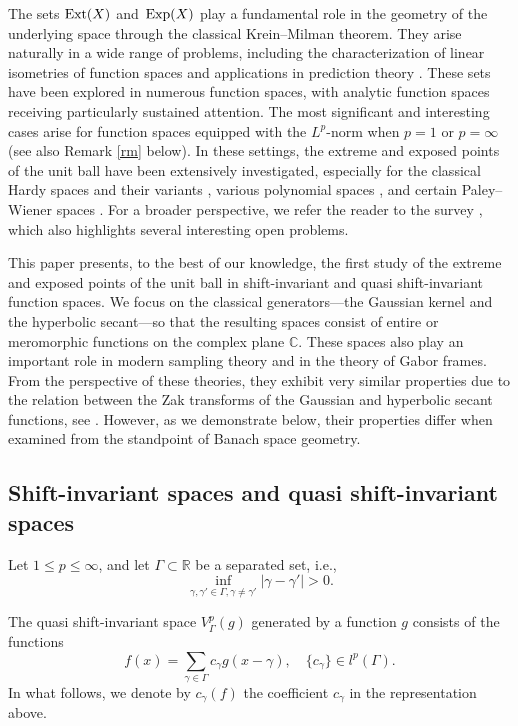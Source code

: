 \documentclass[12pt]{amsart}
\numberwithin{equation}{section}
\theoremstyle{plain}
\theoremstyle{definition}
\newcommand{\R}{{\mathbb R}} \newcommand{\Q}{{\mathbb Q}} \newcommand{\Z}{{\mathbb Z}} \newcommand{\N}{{\mathbb N}}
\newcommand{\ext}{{\rm Ext}}
\newcommand{\expo}{\,{\rm Exp}}
\begin{document}
The sets $\ext(X)$ and $\expo(X)$ play a fundamental role in the geometry of the underlying space through the classical Krein–Milman theorem. They arise naturally in a wide range of problems, including the characterization of linear isometries of function spaces  \cite{MR121646} and applications in prediction theory \cite{MR705750}.
These sets have been explored in numerous function spaces, with analytic function spaces receiving particularly sustained attention. The most significant and interesting cases arise for function spaces equipped with the 
$L^p$-norm when $p=1$ or $p=\infty$ (see also Remark \ref{rm} below). In these settings, the extreme and exposed points of the unit ball have been extensively investigated, especially for the classical Hardy spaces and their variants \cite{MR283557, MR98981, MR4394687, MR348467}, various polynomial spaces \cite{MR1783617, MR2024728, MR4205713, MR2403441},  and certain Paley–Wiener spaces \cite{MR1783617, MR4574376}. For a broader perspective, we refer the reader to the survey \cite{MR4582781}, which also highlights several interesting open problems.


This paper presents, to the best of our knowledge, the first study of the extreme and exposed points of the unit ball in shift-invariant and quasi shift-invariant function spaces. We focus on the classical generators—the Gaussian kernel and the hyperbolic secant—so that the resulting spaces consist of entire or meromorphic functions on the complex plane $\mathbb C$.
These spaces also play an important role in modern sampling theory and in the theory of Gabor frames. From the perspective of these theories, they exhibit very similar properties due to the relation between the Zak transforms of the Gaussian and hyperbolic secant functions, see \cite{MR4047939, MR1884237, MR4782146}. However, as we demonstrate below, their properties differ when examined from the standpoint of Banach space geometry.

\subsection{Shift-invariant spaces and quasi shift-invariant spaces}

Let $1 \leq p \leq \infty$, and let $\Gamma\subset\R$ be a separated set, i.e.,
$$
\inf\limits_{\gamma, \gamma' \in \Gamma,\gamma\ne\gamma'} |\gamma - \gamma'| >0.
$$

The quasi shift-invariant space $V_{\Gamma}^p(g)$ generated by a function $g$ consists of the functions 
$$
f(x) = \sum\limits_{\gamma \in \Gamma} c_{\gamma} g(x-\gamma), \quad  \{c_\gamma\} \in l^p(\Gamma).
$$
In what follows, we denote by $c_\gamma(f)$  the coefficient $c_\gamma$  in the representation above.
\end{document}

